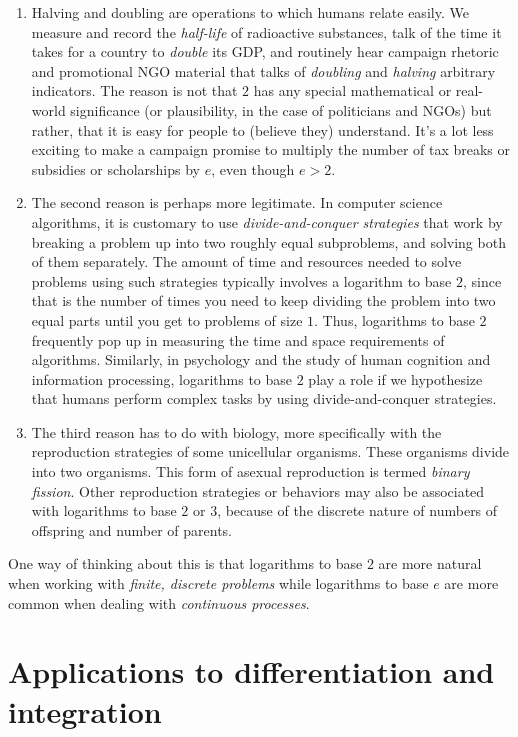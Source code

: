\documentclass[10pt]{amsart}
\begin{document}
\begin{enumerate}
\item Halving and doubling are operations to which humans relate
  easily. We measure and record the {\em half-life} of radioactive
  substances, talk of the time it takes for a country to {\em double}
  its GDP, and routinely hear campaign rhetoric and promotional NGO
  material that talks of {\em doubling} and {\em halving} arbitrary
  indicators. The reason is not that $2$ has any special mathematical
  or real-world significance (or plausibility, in the case of
  politicians and NGOs) but rather, that it is easy for people to
  (believe they) understand. It's a lot less exciting to make a
  campaign promise to multiply the number of tax breaks or subsidies
  or scholarships by $e$, even though $e > 2$.
\item The second reason is perhaps more legitimate. In computer
  science algorithms, it is customary to use {\em divide-and-conquer
  strategies} that work by breaking a problem up into two roughly
  equal subproblems, and solving both of them separately. The amount
  of time and resources needed to solve problems using such strategies
  typically involves a logarithm to base $2$, since that is the number
  of times you need to keep dividing the problem into two equal parts
  until you get to problems of size $1$. Thus, logarithms to base $2$
  frequently pop up in measuring the time and space requirements of
  algorithms. Similarly, in psychology and the study of human
  cognition and information processing, logarithms to base $2$ play a
  role if we hypothesize that humans perform complex tasks by using
  divide-and-conquer strategies.
\item The third reason has to do with biology, more specifically with
  the reproduction strategies of some unicellular organisms. These
  organisms divide into two organisms. This form of asexual
  reproduction is termed {\em binary fission}. Other reproduction
  strategies or behaviors may also be associated with logarithms to
  base $2$ or $3$, because of the discrete nature of numbers of
  offspring and number of parents.
\end{enumerate}

One way of thinking about this is that logarithms to base $2$ are more
natural when working with {\em finite, discrete problems} while
logarithms to base $e$ are more common when dealing with {\em
continuous processes}.

\section{Applications to differentiation and integration}
\end{document}
